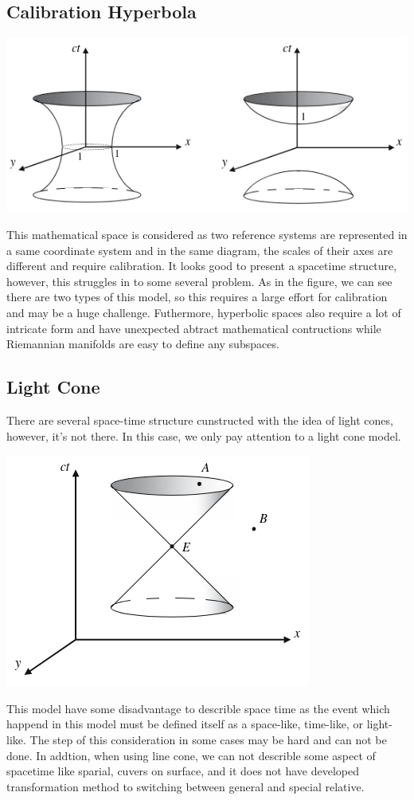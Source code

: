 \documentclass[11pt,a4paper]{article}
\begin{document}
	\subsection{Calibration Hyperbola}
	\begin{center}
		\includegraphics[scale=0.5]{./hyper_space.png}
	\end{center}
	This mathematical space is considered as two reference systems are represented in a same coordinate system and in the same diagram, the scales of their axes are different and require calibration. It looks good to present a spacetime structure, however, this struggles in to some several problem.
	As in the figure, we can see there are two types of this model, so this requires a large effort for calibration and may be a huge challenge. Futhermore, hyperbolic spaces also require a lot of intricate form and have unexpected abtract mathematical contructions while Riemannian manifolds are easy to define any subspaces.
	\subsection{Light Cone}
	There are several space-time structure cunstructed with the idea of light cones, however, it's not there. In this case, we only pay attention to a light cone model.
	\begin{center}
		\includegraphics[scale=0.5]{./lih_cone.png}
	\end{center} 
	This model have some disadvantage to describle space time as the event which happend in this model must be defined itself as a space-like, time-like, or light-like. The step of this consideration in some cases may be hard and can not be done.  In addtion, when using line cone, we can not describle some aspect of spacetime like sparial, cuvers on surface, and it does not have developed transformation method to switching between general and special relative.
\end{document}
